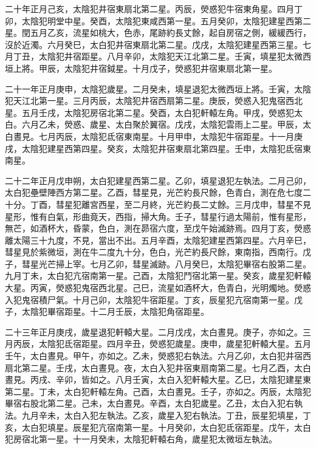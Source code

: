 \begin{pinyinscope}
 二十年正月己亥，太陰犯井宿東扇北第二星。丙辰，熒惑犯牛宿東角星。四月丁卯，太陰犯明堂中星。癸酉，太陰犯東咸西第一星。五月癸卯，太陰犯建星西第二星。閏五月乙亥，流星如桃大，色赤，尾跡約長丈餘，起自房宿之側，緩緩西行，沒於近濁。六月癸巳，太白犯井宿東扇北第二星。戊戌，太陰犯建星西第三星。七月丁丑，太陰犯井宿距星。八月辛卯，太陰犯天江北第二星。壬寅，填星犯太微西垣上將。甲辰，太陰犯井宿鉞星。十月戊子，熒惑犯井宿東扇北第一星。



 二十一年正月庚申，太陰犯歲星。二月癸未，填星退犯太微西垣上將。壬寅，太陰犯天江北第一星。三月丙辰，太陰犯井宿西扇第二星。庚辰，熒惑入犯鬼宿西北星。五月壬戌，太陰犯房宿北第二星。癸酉，太白犯軒轅左角。甲戌，熒惑犯太白。六月乙未，熒惑、歲星、太白聚於翼宿。戊戌，太陰犯雲雨上二星。甲辰，太白晝見。七月丙辰，太陰犯氐宿東南星。十月甲申，太陰犯牛宿距星。十一月庚戌，太陰犯建星西第四星。癸亥，太陰犯井宿東扇北第四星。壬申，太陰犯氐宿東南星。



 二十二年正月戊申朔，太白犯建星西第二星。乙卯，填星退犯左執法。二月己卯，太白犯壘壁陣西方第二星。乙酉，彗星見，光芒約長尺餘，色青白，測在危七度二十分。丁酉，彗星犯離宮西星，至二月終，光芒約長二丈餘。三月戊申，彗星不見星形，惟有白氣，形曲竟天，西指，掃大角。壬子，彗星行過太陽前，惟有星形，無芒，如酒杯大，昏蒙，色白，測在昴宿六度，至戊午始滅跡焉。四月丁亥，熒惑離太陽三十九度，不見，當出不出。五月辛酉，太陰犯建星西第四星。六月辛巳，彗星見於紫微垣，測在牛二度九十分，色白，光芒約長尺餘，東南指，西南行。戊子，彗星光芒掃上宰。七月乙卯，彗星滅跡。八月癸巳，太陰犯畢宿右股第二星。九月丁未，太白犯亢宿南第一星。己酉，太陰犯鬥宿北第一星。癸亥，歲星犯軒轅大星。丙寅，熒惑犯鬼宿西北星。己巳，流星如酒杯大，色青白，光明燭地。熒惑入犯鬼宿積尸氣。十月己卯，太陰犯牛宿距星。丁亥，辰星犯亢宿南第一星。戊子，太陰犯畢宿距星。十二月壬辰，太陰犯角宿距星。



 二十三年正月庚戌，歲星退犯軒轅大星。二月戊戌，太白晝見。庚子，亦如之。三月丙辰，太陰犯氐宿距星。四月辛丑，熒惑犯歲星。庚申，歲星犯軒轅大星。五月壬午，太白晝見。甲午，亦如之。乙未，熒惑犯右執法。六月乙卯，太白犯井宿西扇北第二星。壬戌，太白晝見。夜，太白入犯井宿東扇南第二星。七月乙酉，太白晝見。丙戌、辛卯，皆如之。八月壬寅，太白入犯軒轅大星。乙巳，太陰犯建星東第二星。丁未，太白犯軒轅左角。己酉，太白晝見。壬子，亦如之。丙辰，太陰犯畢宿右股北第二星。己未，太白晝見。辛酉，太白犯歲星。乙丑，太白入犯右執法。九月辛未，太白入犯左執法。乙亥，歲星入犯右執法。丁丑，辰星犯填星，丁亥，太白犯填星。辰星犯亢宿南第一星。十月癸卯，太白犯氐宿距星。戊午，太白犯房宿北第一星。十一月癸未，太陰犯軒轅右角，歲星犯太微垣左執法。




\end{pinyinscope}
